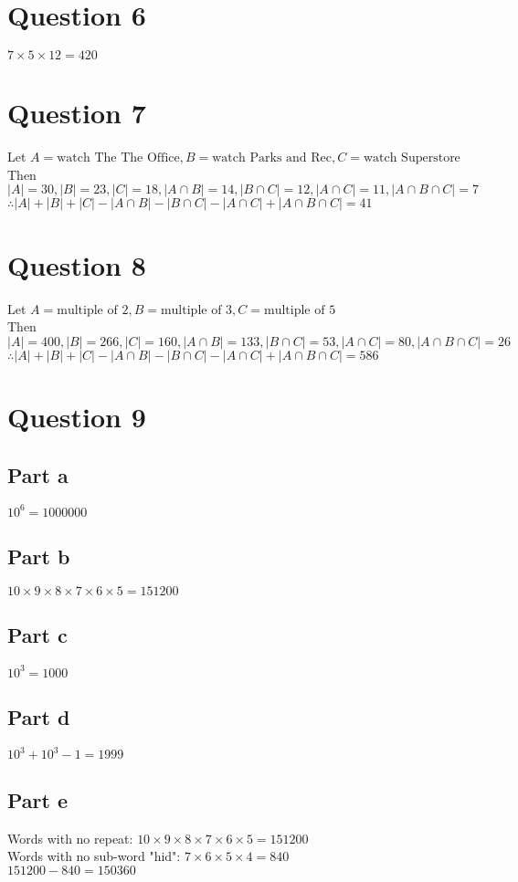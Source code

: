 \documentclass[11pt, oneside]{article}   	%
\begin{document}
\section*{Question 6}

	$7\times 5 \times  12=420$

\section*{Question 7}

	Let $A=\text{watch The The Office}, B=\text{watch Parks and Rec}, C=\text{watch Superstore}$\\
	Then $|A|=30, |B|=23, |C|=18, |A\cap B|=14, |B\cap C|=12, |A\cap C|=11, |A\cap B \cap C|=7$\\
	$\therefore |A|+|B|+|C|-|A\cap B|-|B\cap C|-|A\cap C|+|A\cap B \cap C|=41$

\section*{Question 8}

Let $A=\text{multiple of 2}, B=\text{multiple of 3}, C=\text{multiple of 5}$\\
Then $|A|=400, |B|=266, |C|=160, |A\cap B|=133, |B\cap C|=53, |A\cap C|=80, |A\cap B \cap C|=26$\\
$\therefore |A|+|B|+|C|-|A\cap B|-|B\cap C|-|A\cap C|+|A\cap B \cap C|=586$

\section*{Question 9}

\subsection*{Part a}
$10^{6}=1000000$
\subsection*{Part b}
$10 \times 9 \times 8 \times 7 \times 6 \times 5 = 151200$
\subsection*{Part c}
$10^{3}=1000$
\subsection*{Part d}
$10^{3}+10^{3}-1=1999$
\subsection*{Part e}
Words with no repeat: $10 \times 9 \times 8 \times 7 \times 6 \times 5 = 151200$\\
Words with no sub-word "hid": $7 \times 6 \times 5\times 4 = 840$\\
$151200-840=150360$
\end{document}

